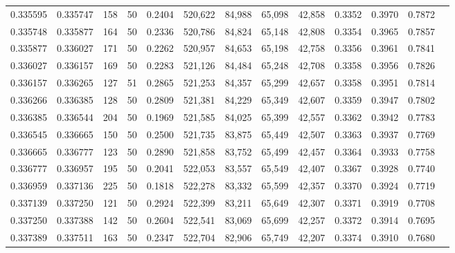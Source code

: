 \begin{tabular}{rrrrrrrrrrrrr}
0.335595 & 0.335747 &   158 &  50 &                                     0.2404 & 520,622 &  84,988 &  65,098 &  42,858 & 0.3352 & 0.3970 & 0.7872 \\
0.335748 & 0.335877 &   164 &  50 &                                     0.2336 & 520,786 &  84,824 &  65,148 &  42,808 & 0.3354 & 0.3965 & 0.7857 \\
0.335877 & 0.336027 &   171 &  50 &                                     0.2262 & 520,957 &  84,653 &  65,198 &  42,758 & 0.3356 & 0.3961 & 0.7841 \\
0.336027 & 0.336157 &   169 &  50 &                                     0.2283 & 521,126 &  84,484 &  65,248 &  42,708 & 0.3358 & 0.3956 & 0.7826 \\
0.336157 & 0.336265 &   127 &  51 &                                     0.2865 & 521,253 &  84,357 &  65,299 &  42,657 & 0.3358 & 0.3951 & 0.7814 \\
0.336266 & 0.336385 &   128 &  50 &                                     0.2809 & 521,381 &  84,229 &  65,349 &  42,607 & 0.3359 & 0.3947 & 0.7802 \\
0.336385 & 0.336544 &   204 &  50 &                                     0.1969 & 521,585 &  84,025 &  65,399 &  42,557 & 0.3362 & 0.3942 & 0.7783 \\
0.336545 & 0.336665 &   150 &  50 &                                     0.2500 & 521,735 &  83,875 &  65,449 &  42,507 & 0.3363 & 0.3937 & 0.7769 \\
0.336665 & 0.336777 &   123 &  50 &                                     0.2890 & 521,858 &  83,752 &  65,499 &  42,457 & 0.3364 & 0.3933 & 0.7758 \\
0.336777 & 0.336957 &   195 &  50 &                                     0.2041 & 522,053 &  83,557 &  65,549 &  42,407 & 0.3367 & 0.3928 & 0.7740 \\
0.336959 & 0.337136 &   225 &  50 &                                     0.1818 & 522,278 &  83,332 &  65,599 &  42,357 & 0.3370 & 0.3924 & 0.7719 \\
0.337139 & 0.337250 &   121 &  50 &                                     0.2924 & 522,399 &  83,211 &  65,649 &  42,307 & 0.3371 & 0.3919 & 0.7708 \\
0.337250 & 0.337388 &   142 &  50 &                                     0.2604 & 522,541 &  83,069 &  65,699 &  42,257 & 0.3372 & 0.3914 & 0.7695 \\
0.337389 & 0.337511 &   163 &  50 &                                     0.2347 & 522,704 &  82,906 &  65,749 &  42,207 & 0.3374 & 0.3910 & 0.7680 \\

\end{tabular}
